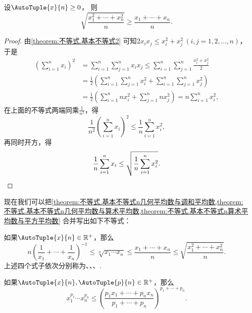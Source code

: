 \begin{proposition}\label{theorem:不等式.基本不等式n算术平均数与平方平均数}
设\(\AutoTuple{x}{n}\geq0\)，
则\[
	\sqrt{\frac{x_1^2+\dotsb+x_n^2}{n}} \geq \frac{x_1+\dotsb+x_n}{n}.
\]
\begin{proof}
由\cref{theorem:不等式.基本不等式2}
可知\(2 x_i x_j \leq x_i^2 + x_j^2\ (i,j=1,2,\dotsc,n)\)，
于是\begin{align*}
	\left(\sum_{i=1}^n x_i\right)^2
	&=\sum_{i=1}^n \sum_{j=1}^n x_i x_j
	\leq \sum_{i=1}^n \sum_{j=1}^n \frac{x_i^2+x_j^2}{2} \\
	&= \frac12 \left(
		\sum_{i=1}^n \sum_{j=1}^n x_i^2
		+ \sum_{i=1}^n \sum_{j=1}^n x_j^2
	\right) \\
	&= \frac12 \left(
		\sum_{i=1}^n n x_i^2
		+ \sum_{j=1}^n n x_j^2
	\right)
	= n \sum_{i=1}^n x_i^2,
\end{align*}
在上面的不等式两端同乘\(\frac{1}{n^2}\)，得\[
	\frac{1}{n^2} \left(\sum_{i=1}^n x_i\right)^2
	\leq \frac1n \sum_{i=1}^n x_i^2,
\]
再同时开方，得\[
	\frac1n \sum_{i=1}^n x_i
	\leq \sqrt{\frac1n \sum_{i=1}^n x_i^2}.
	\qedhere
\]
\end{proof}
\end{proposition}

现在我们可以把\cref{theorem:不等式.基本不等式n几何平均数与调和平均数,theorem:不等式.基本不等式n几何平均数与算术平均数,theorem:不等式.基本不等式n算术平均数与平方平均数} 合并写出如下不等式：
\begin{theorem}\label{theorem:不等式.均值不等式}
如果\(\AutoTuple{x}{n}\in\mathbb{R}^+\)，那么
\begin{equation}
n \left( \frac{1}{x_1} + \dotsb + \frac{1}{x_n} \right)^{-1}
\leq \sqrt[n]{x_1 \dotsm x_n}
\leq \frac{x_1 + \dotsb + x_n}{n}
\leq \sqrt{\frac{x_1^2 + \dotsb + x_n^2}{n}}.
\end{equation}
\rm
上述四个式子依次分别称为、、、.
\end{theorem}

\begin{corollary}\label{theorem:不等式.均值不等式推论}
如果\(\AutoTuple{x}{n},\AutoTuple{p}{n}\in\mathbb{R}^+\)，那么
\begin{equation}
x_1^{p_1} \dotsm x_n^{p_n}
\leq
\left( \frac{p_1 x_1 + \dotsb + p_n x_n}{p_1 + \dotsb + p_n} \right)^{p_1 + \dotsb + p_n}.
\end{equation}
\end{corollary}

